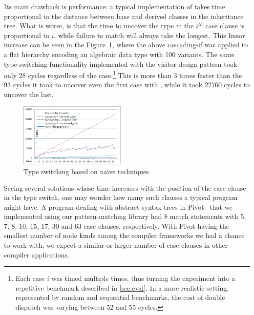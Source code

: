 \noindent
Its main drawback is performance: a typical 
implementation of  takes time proportional to the 
distance between base and derived classes in the inheritance tree.
What is worse, is that the time to uncover the type in the $i^{th}$ case clause 
is proportional to $i$, while failure to match will always take the longest. 
This linear increase can be seen in the Figure~\ref{fig:DCastVis1}, where 
the above cascading-if was applied to a flat hierarchy encoding an algebraic 
data type with 100 variants. The same type-switching functionality implemented 
with the visitor design pattern took only 28 cycles regardless of the 
case.\footnote{Each case $i$ was timed multiple times, thus turning the experiment 
into a repetitive benchmark described in \textsection\ref{sec:eval}. In a more
realistic setting, represented by random and sequential benchmarks, the cost of 
double dispatch was varying between 52 and 55 cycles.}
This is more than 3 times faster than the 93 cycles it took to uncover even the 
first case with , while it took 22760 cycles to uncover the 
last.

\begin{figure}[htbp]
  \centering
    \includegraphics[width=0.47\textwidth]{DCast-vs-Visitors1.png}
  \caption{Type switching based on na\"ive techniques}
  \label{fig:DCastVis1}
\end{figure}

Seeing several solutions whose time increases with the position of the case 
clause in the type switch, one may wonder how many such clauses a typical 
program might have. A program dealing with abstract syntax trees in 
Pivot~\cite{Pivot09} that we implemented using our pattern-matching library had 
8 match statements with 5, 7, 8, 10, 15, 17, 30 and 63 case clauses, 
respectively. With Pivot having the smallest number of node kinds among the 
compiler frameworks we had a chance to work with, we expect a similar or larger 
number of case clauses in other compiler applications.


